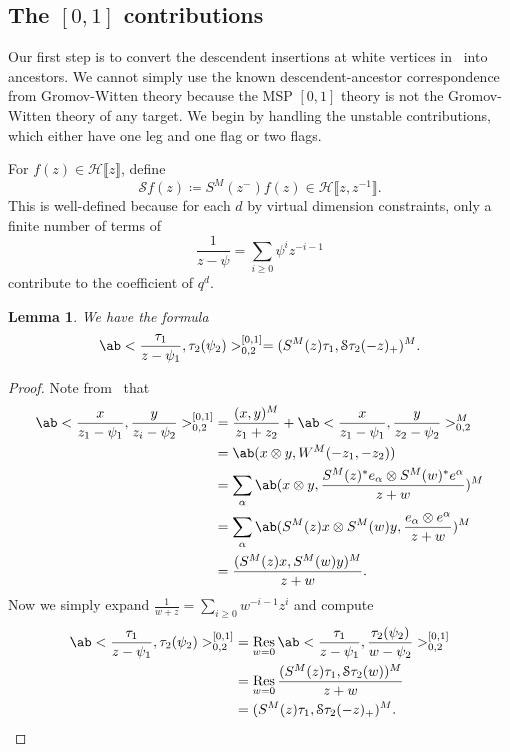 \documentclass[10pt]{amsart}
\newtheorem{lem}[thm]{Lemma}
\theoremstyle{definition}
\theoremstyle{remark}
\theoremstyle{plain}
\theoremstyle{definition}
\theoremstyle{remark}
\newcommand{\mc}[1]{\mathcal{#1}}
\newcommand{\msc}[1]{\mathscr{#1}}
\newcommand{\1}{\mathbf{1}}
\newcommand{\2}{\mathbf{2}}
\newcommand{\3}{\mathbf{3}}
\newcommand{\ps}[1]{\llbracket #1 \rrbracket}
\DeclareMathOperator{\Res}{Res}
\numberwithin{equation}{section}
\begin{document}
\subsection{The $[0,1]$ contributions}%
\label{sub:Proof of polynomiality of 01}

Our first step is to convert the descendent insertions at white vertices in~ into ancestors. We cannot simply use the known descendent-ancestor correspondence from Gromov-Witten theory because the MSP $[0,1]$ theory is not the Gromov-Witten theory of any target. We begin by handling the unstable contributions, which either have one leg and one flag or two flags.

For $f(z) \in \msc{H}\ps{z}$, define
\[ \mc{S} f(z) \coloneqq S^M(z^-) f(z) \in \mc{H}\ps{z, z^{-1}}. \]
This is well-defined because for each $d$ by virtual dimension constraints, only a finite number of terms of
\[ \frac{1}{z-\psi} = \sum_{i \geq 0} \psi^i z^{-i-1} \]
contribute to the coefficient of $q^d$.

\begin{lem}
    We have the formula
    \[ \ab<\frac{\tau_1}{z-\psi_1}, \tau_2(\psi_2)>_{0,2}^{[0,1]} = (S^M(z) \tau_1, \mc{S}\tau_2(-z)_+)^M. \]
\end{lem}

\begin{proof}
    Note from~ that
    \begin{align*}
        \ab<\frac{x}{z_1 - \psi_1}, \frac{y}{z_i-\psi_2}>_{0,2}^{[0,1]} &= \frac{(x,y)^M}{z_1+z_2} + \ab<\frac{x}{z_1 - \psi_1}, \frac{y}{z_2-\psi_2}>_{0,2}^{M} \\
        &= \ab(x \otimes y, W^M(-z_1, -z_2)) \\
        &= \sum_{\alpha}\ab(x\otimes y, \frac{S^M(z)^* e_{\alpha} \otimes S^M(w)^* e^{\alpha}}{z+w})^M \\
        &= \sum_{\alpha} \ab(S^M(z)x \otimes S^M(w)y, \frac{e_{\alpha} \otimes e^{\alpha}}{z+w})^M \\
        &= \frac{(S^M(z) x, S^M(w)y)^M}{z+w}.
    \end{align*}
    Now we simply expand $\frac{1}{w+z} = \sum_{i\geq 0} w^{-i-1} z^i$ and compute
    \begin{align*}
        \ab<\frac{\tau_1}{z-\psi_1}, \tau_2(\psi_2)>_{0,2}^{[0,1]} &= \Res_{w=0}\ab<\frac{\tau_1}{z-\psi_1}, \frac{\tau_2(\psi_2)}{w-\psi_2}>_{0,2}^{[0,1]} \\
        &= \Res_{w=0} \frac{(S^M(z) \tau_1, \mc{S}\tau_2(w))^M}{z+w} \\
        &= (S^M(z)\tau_1, \mc{S}\tau_2(-z)_+)^M. \qedhere
    \end{align*}
\end{proof}
\end{document}
